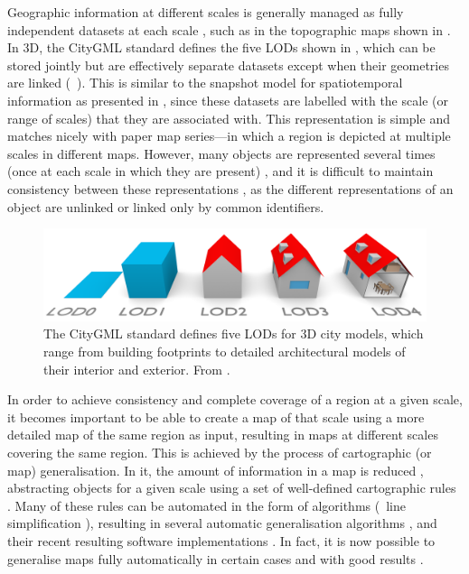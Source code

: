 Geographic information at different scales is generally managed as fully independent datasets at each scale \citep{Meijers11}, such as in the topographic maps shown in .
In 3D, the CityGML standard \citep{CityGML2} defines the five LODs shown in , which can be stored jointly but are effectively separate datasets except when their geometries are linked (\cf\ \citet{Biljecki15}).
This is similar to the snapshot model for spatiotemporal information \citep{Basoglu78,Langran88} as presented in , since these datasets are labelled with the scale (or range of scales) that they are associated with.
This representation is simple and matches nicely with paper map series---in which a region is depicted at multiple scales in different maps.
However, many objects are represented several times (once at each scale in which they are present) \citep{Friis-Christensen03}, and it is difficult to maintain consistency between these representations \citep{Buttenfield89}, as the different representations of an object are unlinked or linked only by common identifiers.

\begin{figure}[tbp]
\centering
\includegraphics[width=\linewidth]{figs/citygml-filip}
\caption[The LODs in CityGML]{The CityGML standard \citep{CityGML2} defines five LODs for 3D city models, which range from building footprints to detailed architectural models of their interior and exterior. From \citet{Biljecki14a}.}
\label{fig:citygml-filip}
\end{figure}

In order to achieve consistency and complete coverage of a region at a given scale, it becomes important to be able to create a map of that scale using a more detailed map of the same region as input, resulting in maps at different scales covering the same region.
This is achieved by the process of cartographic (or map) generalisation.
In it, the amount of information in a map is reduced \citep{Tofper66}, abstracting objects for a given scale using a set of well-defined cartographic rules \citep{SGK75}.
Many of these rules can be automated in the form of algorithms (\eg\ line simplification \citep{Douglas73}), resulting in several automatic generalisation algorithms \citep{Weibel97}, and their recent resulting software implementations \citep{Jones05,Stoter09}.
In fact, it is now possible to generalise maps fully automatically in certain cases and with good results \citep{Stoter14}.

